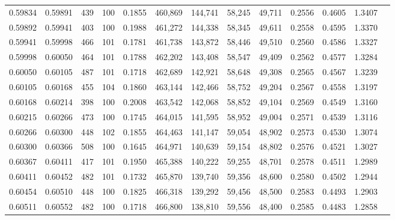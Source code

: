 \begin{tabular}{rrrrrrrrrrrrr}
0.59834 & 0.59891 &   439 & 100 &                                     0.1855 & 460,869 & 144,741 &  58,245 &  49,711 & 0.2556 & 0.4605 & 1.3407 \\
0.59892 & 0.59941 &   403 & 100 &                                     0.1988 & 461,272 & 144,338 &  58,345 &  49,611 & 0.2558 & 0.4595 & 1.3370 \\
0.59941 & 0.59998 &   466 & 101 &                                     0.1781 & 461,738 & 143,872 &  58,446 &  49,510 & 0.2560 & 0.4586 & 1.3327 \\
0.59998 & 0.60050 &   464 & 101 &                                     0.1788 & 462,202 & 143,408 &  58,547 &  49,409 & 0.2562 & 0.4577 & 1.3284 \\
0.60050 & 0.60105 &   487 & 101 &                                     0.1718 & 462,689 & 142,921 &  58,648 &  49,308 & 0.2565 & 0.4567 & 1.3239 \\
0.60105 & 0.60168 &   455 & 104 &                                     0.1860 & 463,144 & 142,466 &  58,752 &  49,204 & 0.2567 & 0.4558 & 1.3197 \\
0.60168 & 0.60214 &   398 & 100 &                                     0.2008 & 463,542 & 142,068 &  58,852 &  49,104 & 0.2569 & 0.4549 & 1.3160 \\
0.60215 & 0.60266 &   473 & 100 &                                     0.1745 & 464,015 & 141,595 &  58,952 &  49,004 & 0.2571 & 0.4539 & 1.3116 \\
0.60266 & 0.60300 &   448 & 102 &                                     0.1855 & 464,463 & 141,147 &  59,054 &  48,902 & 0.2573 & 0.4530 & 1.3074 \\
0.60300 & 0.60366 &   508 & 100 &                                     0.1645 & 464,971 & 140,639 &  59,154 &  48,802 & 0.2576 & 0.4521 & 1.3027 \\
0.60367 & 0.60411 &   417 & 101 &                                     0.1950 & 465,388 & 140,222 &  59,255 &  48,701 & 0.2578 & 0.4511 & 1.2989 \\
0.60411 & 0.60452 &   482 & 101 &                                     0.1732 & 465,870 & 139,740 &  59,356 &  48,600 & 0.2580 & 0.4502 & 1.2944 \\
0.60454 & 0.60510 &   448 & 100 &                                     0.1825 & 466,318 & 139,292 &  59,456 &  48,500 & 0.2583 & 0.4493 & 1.2903 \\
0.60511 & 0.60552 &   482 & 100 &                                     0.1718 & 466,800 & 138,810 &  59,556 &  48,400 & 0.2585 & 0.4483 & 1.2858 \\

\end{tabular}
